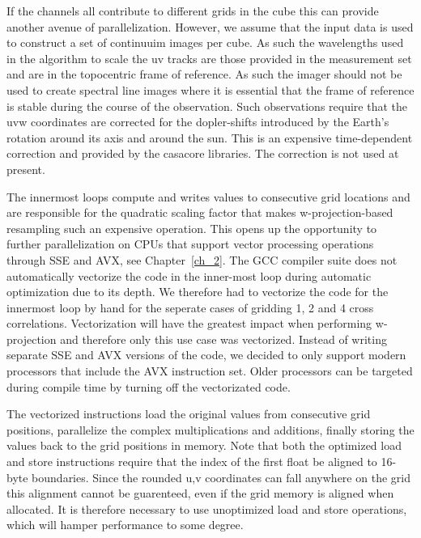 If the channels all contribute to different grids in the cube this can provide another avenue of parallelization. However, we assume that the input data is used to
construct a set of continuuim images per cube. As such the wavelengths used in the algorithm to scale the uv tracks are those provided in the measurement set and are in the topocentric
frame of reference. As such the imager should not be used to create spectral line images where it is essential that the frame of reference is stable during the course of the observation.
Such observations require that the uvw coordinates are corrected for the dopler-shifts introduced by the Earth's rotation around its axis and around the sun. This is an expensive time-dependent
correction and provided by the casacore libraries. The correction is not used at present.

The innermost loops compute and writes values to consecutive grid locations and are responsible for the quadratic scaling factor that makes w-projection-based resampling such an expensive operation. 
This opens up the opportunity to further parallelization on CPUs that support vector processing operations through SSE and AVX, see Chapter~\ref{ch_2}. The GCC compiler suite does not automatically vectorize the code in the inner-most 
loop during automatic optimization due to its depth. We therefore had to vectorize the code for the innermost loop by hand for the seperate cases of gridding 1, 2 and 4 cross correlations. Vectorization will have
the greatest impact when performing w-projection and therefore only this use case was vectorized. Instead of writing separate SSE and AVX versions of the code, we decided to only support modern processors that include the 
AVX instruction set. Older processors can be targeted during compile time by turning off the vectorizated code.

The vectorized instructions load the original values from consecutive grid positions, parallelize the complex multiplications and additions, finally storing the values back to the grid positions in memory. Note that 
both the optimized load and store instructions require that the index of the first float be aligned to 16-byte boundaries. Since the rounded u,v coordinates can fall anywhere on the grid this alignment cannot be guarenteed,
even if the grid memory is aligned when allocated. It is therefore necessary to use unoptimized load and store operations, which will hamper performance to some degree.

